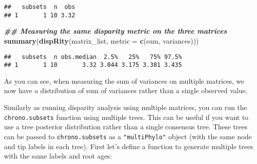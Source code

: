 \documentclass[
]{book}
\newenvironment{Shaded}{\begin{snugshade}}{\end{snugshade}}
\newcommand{\AttributeTok}[1]{\textcolor[rgb]{0.13,0.29,0.53}{#1}}
\newcommand{\DocumentationTok}[1]{\textcolor[rgb]{0.56,0.35,0.01}{\textbf{\textit{#1}}}}
\newcommand{\FunctionTok}[1]{\textcolor[rgb]{0.13,0.29,0.53}{\textbf{#1}}}
\newcommand{\NormalTok}[1]{#1}
\begin{document}
\begin{verbatim}
##   subsets  n  obs
## 1       1 10 3.32
\end{verbatim}

\begin{Shaded}
\begin{Highlighting}[]
\DocumentationTok{\#\# Measuring the same disparity metric on the three matrices}
\FunctionTok{summary}\NormalTok{(}\FunctionTok{dispRity}\NormalTok{(matrix\_list, }\AttributeTok{metric =} \FunctionTok{c}\NormalTok{(sum, variances)))}
\end{Highlighting}
\end{Shaded}

\begin{verbatim}
##   subsets  n obs.median  2.5%   25%   75% 97.5%
## 1       1 10       3.32 3.044 3.175 3.381 3.435
\end{verbatim}

As you can see, when measuring the sum of variances on multiple matrices, we now have a distribution of sum of variances rather than a single observed value.

Similarly as running disparity analysis using multiple matrices, you can run the \texttt{chrono.subsets} function using multiple trees.
This can be useful if you want to use a tree posterior distribution rather than a single consensus tree.
These trees can be passed to \texttt{chrono.subsets} as a \texttt{"multiPhylo"} object (with the same node and tip labels in each tree).
First let's define a function to generate multiple trees with the same labels and root ages:
\end{document}
